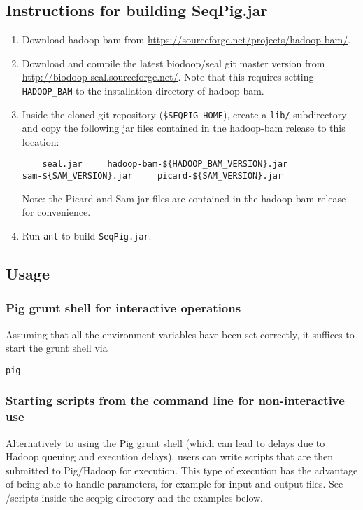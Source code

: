 \subsection{Instructions for building SeqPig.jar}

\begin{enumerate}
\item Download hadoop-bam from \url{https://sourceforge.net/projects/hadoop-bam/}.

\item Download and compile the latest biodoop/seal git master version from
 \url{http://biodoop-seal.sourceforge.net/}. Note that this requires
 setting {\tt HADOOP\_BAM} to the installation directory of hadoop-bam.

\item Inside the cloned git repository ({\tt \$SEQPIG\_HOME}), create a
{\tt lib/} subdirectory and copy the following jar files contained in the
hadoop-bam release to this location:
%
\begin{lstlisting} 
    seal.jar     hadoop-bam-${HADOOP_BAM_VERSION}.jar     sam-${SAM_VERSION}.jar     picard-${SAM_VERSION}.jar
\end{lstlisting}
%
Note: the Picard and Sam jar files are contained in the hadoop-bam release
for convenience.

\item Run {\tt ant} to build {\tt SeqPig.jar}.
\end{enumerate}

\subsection{Usage}

\subsubsection{Pig grunt shell for interactive operations}
Assuming that all the environment variables have been set correctly, it suffices
to start the grunt shell via
%
\begin{lstlisting}
pig
\end{lstlisting}
%
\subsubsection{Starting scripts from the command line for non-interactive use}
Alternatively to using the Pig grunt shell (which can lead to delays due to
Hadoop queuing and execution delays), users can write scripts that are
then submitted to Pig/Hadoop for execution. This type of execution has
the advantage of being able to handle parameters, for example for input
and output files. See /scripts inside the seqpig directory and the
examples below.
